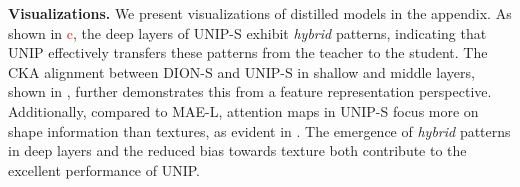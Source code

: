 \textbf{Visualizations.} We present visualizations of distilled models in the appendix. As shown in \textcolor{red}{c}, the deep layers of UNIP-S exhibit \textit{hybrid} patterns, indicating that UNIP effectively transfers these patterns from the teacher to the student. The CKA alignment between DION-S and UNIP-S in shallow and middle layers, shown in , further demonstrates this from a feature representation perspective. Additionally, compared to MAE-L, attention maps in UNIP-S focus more on shape information than textures, as evident in . The emergence of \textit{hybrid} patterns in deep layers and the reduced bias towards texture both contribute to the excellent performance of UNIP.